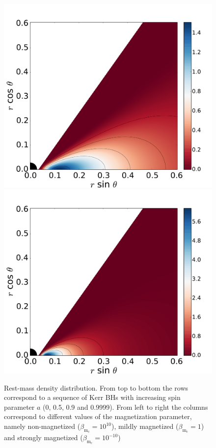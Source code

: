 \documentclass[twocolumn,aps,showpacs,showkeys,prd,superscriptaddress,byrevtex, amsmath]{revtex4-1}
\begin{document}
\begin{figure}
\includegraphics[scale=0.14]{figures/fig9_09999_1.pdf}
\hspace{-0.2cm}
\includegraphics[scale=0.14]{figures/fig9_09999__10.pdf}
\hspace{-0.2cm}
\caption{Rest-mass density distribution. From top to bottom the rows correspond to a sequence of Kerr BHs with increasing spin parameter $a$ (0, 0.5, 0.9 and 0.9999). From left to right the columns correspond to different values of the magnetization parameter, namely non-magnetized ($\beta_{\mathrm{m}_{\mathrm{c}}} = 10^{10}$), mildly magnetized ($\beta_{\mathrm{m}_{\mathrm{c}}} = 1$) and strongly magnetized ($\beta_{\mathrm{m}_{\mathrm{c}}} = 10^{-10}$)}
\label{models_Kerr}
\end{figure}
\end{document}
